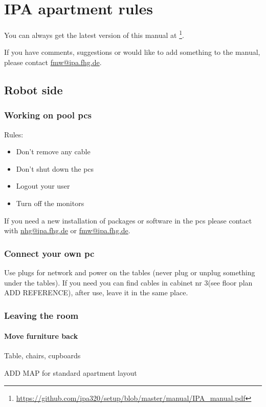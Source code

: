 \chapter{IPA apartment rules}
\label{chap:apartment-rules} 

You can always get the latest version of this manual at \footnote{\url{https://github.com/ipa320/setup/blob/master/manual/IPA_manual.pdf}}.

If you have comments, suggestions or would like to add something to the manual, please contact \href{mailto:fmw@ipa.fhg.de}{fmw@ipa.fhg.de}.

\section{Robot side}


\subsection{Working on pool pcs}
Rules:
\begin{itemize}
\item Don't remove any cable
\item Don't shut down the pcs
\item Logout your user
\item Turn off the monitors
\end{itemize}

If you need a new installation of packages or software in the pcs please contact with \href{mailto:nhg@ipa.fhg.de}{nhg@ipa.fhg.de} or \href{mailto:fmw@ipa.fhg.de}{fmw@ipa.fhg.de}.

\subsection{Connect your own pc}
Use plugs for network and power on the tables (never plug or unplug something under the tables).
If you need you can find cables in cabinet nr 3(see floor plan ADD REFERENCE), after use, leave it in the same place.


\subsection{Leaving the room}
\subsubsection{Move furniture back}
Table, chairs, cupboards

ADD MAP for standard apartment layout

